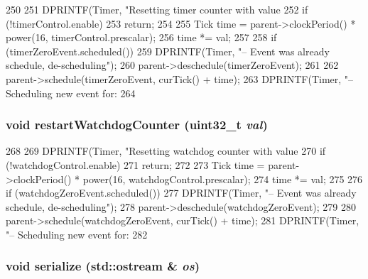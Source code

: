\begin{DoxyCode}
250 {
251     DPRINTF(Timer, "Resetting timer counter with value %
252     if (!timerControl.enable)
253         return;
254 
255     Tick time = parent->clockPeriod() * power(16, timerControl.prescalar);
256     time *= val;
257 
258     if (timerZeroEvent.scheduled()) {
259         DPRINTF(Timer, "-- Event was already schedule, de-scheduling\n");
260         parent->deschedule(timerZeroEvent);
261     }
262     parent->schedule(timerZeroEvent, curTick() + time);
263     DPRINTF(Timer, "-- Scheduling new event for: %
264 }
\end{DoxyCode}
\hypertarget{classCpuLocalTimer_1_1Timer_a88d47ac274ae3a0b35888ac8fa88fb78}{
\subsubsection[{restartWatchdogCounter}]{\setlength{\rightskip}{0pt plus 5cm}void restartWatchdogCounter ({\bf uint32\_\-t} {\em val})}}
\label{classCpuLocalTimer_1_1Timer_a88d47ac274ae3a0b35888ac8fa88fb78}



\begin{DoxyCode}
268 {
269     DPRINTF(Timer, "Resetting watchdog counter with value %
270     if (!watchdogControl.enable)
271         return;
272 
273     Tick time = parent->clockPeriod() * power(16, watchdogControl.prescalar);
274     time *= val;
275 
276     if (watchdogZeroEvent.scheduled()) {
277         DPRINTF(Timer, "-- Event was already schedule, de-scheduling\n");
278         parent->deschedule(watchdogZeroEvent);
279     }
280     parent->schedule(watchdogZeroEvent, curTick() + time);
281     DPRINTF(Timer, "-- Scheduling new event for: %
282 }
\end{DoxyCode}
\hypertarget{classCpuLocalTimer_1_1Timer_a53e036786d17361be4c7320d39c99b84}{
\subsubsection[{serialize}]{\setlength{\rightskip}{0pt plus 5cm}void serialize (std::ostream \& {\em os})}}
\label{classCpuLocalTimer_1_1Timer_a53e036786d17361be4c7320d39c99b84}



